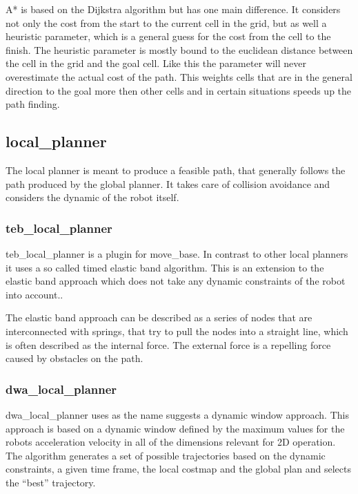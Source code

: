 A* is based on the Dijkstra algorithm but has one main difference. It considers not only the cost from the start to the current cell in the grid, but as well a heuristic parameter, which is a general guess for the cost from the cell to the finish. The heuristic parameter is mostly bound to the euclidean distance between the cell in the grid and the goal cell. Like this the parameter will never overestimate the actual cost of the path\cite{AlgorithmenundDatenstrukturen}. This weights cells that are in the general direction to the goal more then other cells and in certain situations speeds up the path finding.\\

\subsection{local\_planner}
The local planner is meant to produce a feasible path, that generally follows the path produced by the global planner. It takes care of collision avoidance and considers the dynamic of the robot itself.

\subsubsection{teb\_local\_planner}
teb\_local\_planner is a plugin for move\_base. In contrast to other local planners it uses a so called timed elastic band algorithm. This is an extension to the elastic band approach which does not take any dynamic constraints of the robot into account.\cite{Rsmann2012TrajectoryMC}.

The elastic band approach can be described as a series of nodes that are interconnected with springs, that try to pull the nodes into a straight line, which is often described as the internal force. The external force is a repelling force caused by obstacles on the path\cite{elasticband}.

\subsubsection{dwa\_local\_planner}
dwa\_local\_planner uses as the name suggests a dynamic window approach. This approach is based on a dynamic window defined by the maximum values for the robots acceleration velocity in all of the dimensions relevant for 2D operation.\\
The algorithm generates a set of possible trajectories based on the dynamic constraints, a given time frame, the local costmap and the global plan and selects the ``best'' trajectory\cite{dwa}.

